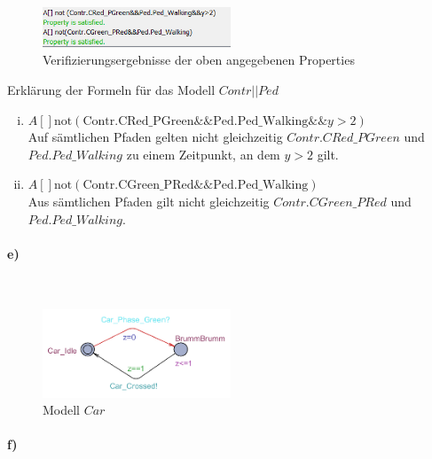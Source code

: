 \begin{figure}[H] 
	\centering 
	\includegraphics[width=0.5\textwidth]{./UPAAAL_Screens/2d_verifyer_Checkd}
	\caption[Aufgabe 2d)]{Verifizierungsergebnisse der oben angegebenen Properties}    
\end{figure}

Erklärung der Formeln für das Modell $Contr||Ped$

\begin{enumerate}[i)]
	
	\item $A \left[\right] \text{not} (\text{Contr.CRed\_PGreen} \&\& \text{Ped.Ped\_Walking} \&\& y>2)$\\
	Auf sämtlichen Pfaden gelten nicht gleichzeitig $Contr.CRed\_PGreen$ und $Ped.Ped\_Walking$ zu einem Zeitpunkt, an dem $y>2$ gilt.
	
	\item $A \left[\right] \text{not} (\text{Contr.CGreen\_PRed} \&\& \text{Ped.Ped\_Walking}) $\\
	Aus sämtlichen Pfaden gilt nicht gleichzeitig $Contr.CGreen\_PRed$ und $Ped.Ped\_Walking$.
\end{enumerate}




\paragraph{e)}\mbox{} \\

\begin{figure}[H] 
	\centering 
	\includegraphics[width=0.5\textwidth]{./UPAAAL_Screens/Car}
	\caption[Aufgabe 2c)]{Modell $Car$}    
\end{figure}


\paragraph{f)}\mbox{} \\

